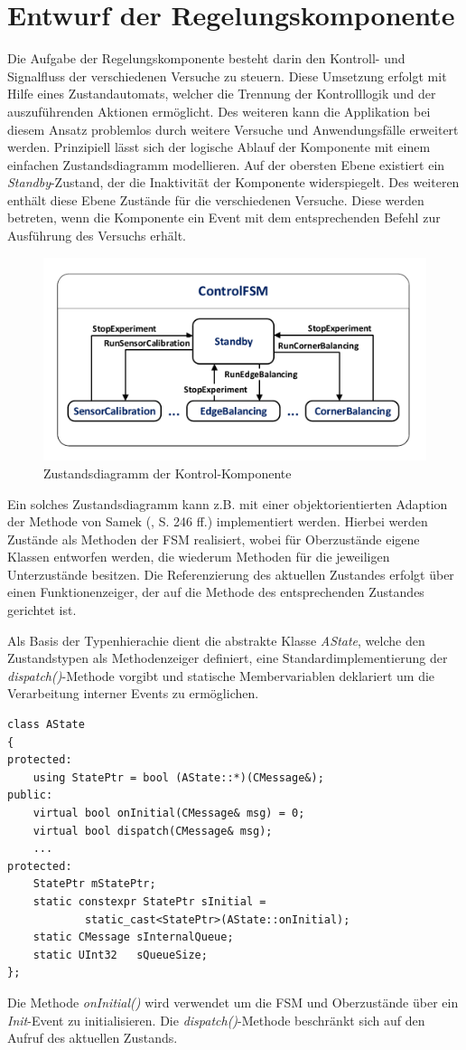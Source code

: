 \section{Entwurf der Regelungskomponente}
Die Aufgabe der Regelungskomponente besteht darin den Kontroll- und Signalfluss der verschiedenen Versuche zu steuern. Diese Umsetzung erfolgt mit Hilfe eines Zustandautomats, welcher die Trennung der Kontrolllogik und der auszuführenden Aktionen ermöglicht. Des weiteren kann die Applikation bei diesem Ansatz problemlos durch weitere Versuche und Anwendungsfälle erweitert werden. 
Prinzipiell lässt sich der logische Ablauf der Komponente mit einem einfachen Zustandsdiagramm modellieren. Auf der obersten Ebene existiert ein \textit{Standby}-Zustand, der die Inaktivität der Komponente widerspiegelt. Des weiteren enthält diese Ebene Zustände für die verschiedenen Versuche. Diese werden betreten, wenn die Komponente ein Event mit dem entsprechenden Befehl zur Ausführung des Versuchs erhält.
\begin{figure}[h!]
\centering
\includegraphics[width=0.7\linewidth]{img/SW_2_ControlComp_SC.pdf}
\caption{Zustandsdiagramm der Kontrol-Komponente}
\end{figure}

Ein solches Zustandsdiagramm kann z.B. mit einer objektorientierten Adaption der Methode von Samek (\cite{Wietzke1}, S. 246 ff.) implementiert werden. Hierbei werden Zustände als Methoden der FSM realisiert, wobei für Oberzustände eigene Klassen entworfen werden, die wiederum Methoden für die jeweiligen Unterzustände besitzen. Die Referenzierung des aktuellen Zustandes erfolgt über einen Funktionenzeiger, der auf die Methode des entsprechenden Zustandes gerichtet ist. 

Als Basis der Typenhierachie dient die abstrakte Klasse \textit{AState}, welche den Zustandstypen als Methodenzeiger definiert, eine Standardimplementierung der \textit{dispatch()}-Methode vorgibt und statische Membervariablen deklariert um die Verarbeitung interner Events zu ermöglichen.
\begin{lstlisting}[caption={Abstrakte Basisklasse für die Zustände},captionpos=b]
class AState
{
protected:
	using StatePtr = bool (AState::*)(CMessage&);
public:
	virtual bool onInitial(CMessage& msg) = 0;
	virtual bool dispatch(CMessage& msg);
	...
protected:
	StatePtr mStatePtr;
	static constexpr StatePtr sInitial = 
			static_cast<StatePtr>(AState::onInitial);
	static CMessage sInternalQueue;
	static UInt32   sQueueSize;
};
\end{lstlisting}
Die Methode \textit{onInitial()} wird verwendet um die FSM und Oberzustände über ein \textit{Init}-Event zu initialisieren. Die \textit{dispatch()}-Methode beschränkt sich auf den Aufruf des aktuellen Zustands.

